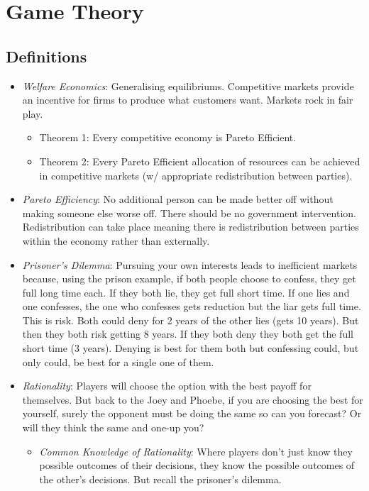 \documentclass[11pt, english]{article}
\begin{document}
\newpage

\section{Game Theory}

	\subsection{Definitions}

	\begin{itemize}
	\setlength\itemsep{0cm}
		\item \textit{Welfare Economics}: Generalising equilibriums. Competitive markets provide an incentive for firms to produce what customers want. Markets rock in fair play.
		\begin{itemize}
			\item Theorem 1: Every competitive economy is Pareto Efficient.
			\item Theorem 2: Every Pareto Efficient allocation of resources can be achieved in competitive markets (w/ appropriate redistribution between parties).
		\end{itemize}
		\item \textit{Pareto Efficiency}: No additional person can be made better off without making someone else worse off. There should be no government intervention. Redistribution can take place meaning there is redistribution between parties within the economy rather than externally.
		\item \textit{Prisoner's Dilemma}: Pursuing your own interests leads to inefficient markets because, using the prison example, if both people choose to confess, they get full long time each. If they both lie, they get full short time. If one lies and one confesses, the one who confesses gets reduction but the liar gets full time. This is risk. Both could deny for 2 years of the other lies (gets 10 years). But then they both risk getting 8 years. If they both deny they both get the full short time (3 years). Denying is best for them both but confessing could, but only could, be best for a single one of them.
		\item \textit{Rationality}: Players will choose the option with the best payoff for themselves. But back to the Joey and Phoebe, if you are choosing the best for yourself, surely the opponent must be doing the same so can you forecast? Or will they think the same and one-up you?
		\begin{itemize}
			\item \textit{Common Knowledge of Rationality}: Where players don't just know they possible outcomes of their decisions, they know the possible outcomes of the other's decisions. But recall the prisoner's dilemma.

\end{itemize}
\end{itemize}
\end{document}
